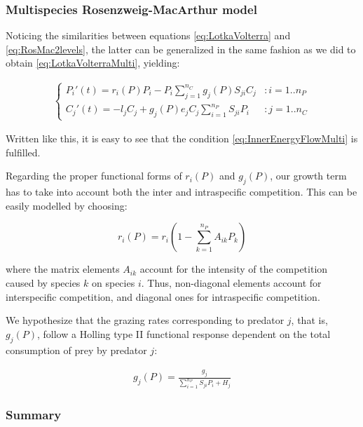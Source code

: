 \subsubsection{Multispecies Rosenzweig-MacArthur model}
\label{subsubsec:Rosenzweig-MacArthurMulti}

Noticing the similarities between equations \ref{eq:LotkaVolterra} and \ref{eq:RosMac2levels}, the latter can be generalized in the same fashion as we did to obtain \ref{eq:LotkaVolterraMulti}, yielding:

\begin{eqnarray}
\label{eq:RosMacMulti}
	\begin{cases}
	P_i'(t) = r_i(P) P_i - P_i \sum_{j = 1}^{n_C} g_j(P) S_{ji} C_j & : i = 1..n_P
	\\
	C_j'(t) = - l_j C_j +  g_j(P) e_j C_j \sum_{i = 1}^{n_P} S_{ji} P_i  & : j = 1..n_C
	\end{cases}
\end{eqnarray}

Written like this, it is easy to see that the condition \ref{eq:InnerEnergyFlowMulti} is fulfilled.

Regarding the proper functional forms of $r_i(P)$ and $g_j(P)$, our growth term has to take into account both the inter and intraspecific competition. This can be easily modelled by choosing:

\begin{equation}
\label{eq:r}
	r_i(P) = r_i \left( 1 - \sum_{k=1}^{n_P} A_{ik} P_k \right)
\end{equation}

where the matrix elements $A_{ik}$ account for the intensity of the competition caused by species $k$ on species $i$. Thus, non-diagonal elements account for interspecific competition, and diagonal ones for intraspecific competition.

We hypothesize that the grazing rates corresponding to predator $j$, that is, $g_j(P)$, follow a Holling type II functional response dependent on the total consumption of prey by predator $j$:

\begin{eqnarray}
\label{eq:g}
	g_j(P) = \frac{g_j}{\sum_{i=1}^{n_P} S_{ji} P_i + H_j}
\end{eqnarray}

\subsubsection{Summary}
\label{subsubsec:SummaryPredation}

